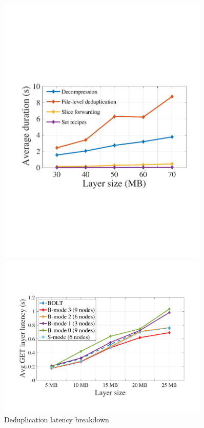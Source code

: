 \begin{figure}[t]
	\centering
	\begin{minipage}{0.3\textwidth}
		\centering
		\includegraphics[width=0.9\textwidth]{graphs/dedupbreakdown.pdf}
		\caption{Deduplication latency breakdown}
		\label{fig:eval-dedupbreakdown}
	\end{minipage}%
	\hspace{1mm}
	\begin{minipage}{0.3\textwidth}
		\centering
		\includegraphics[width=0.9\textwidth]{graphs/dalprimary.pdf}

\end{minipage}
\end{figure}
